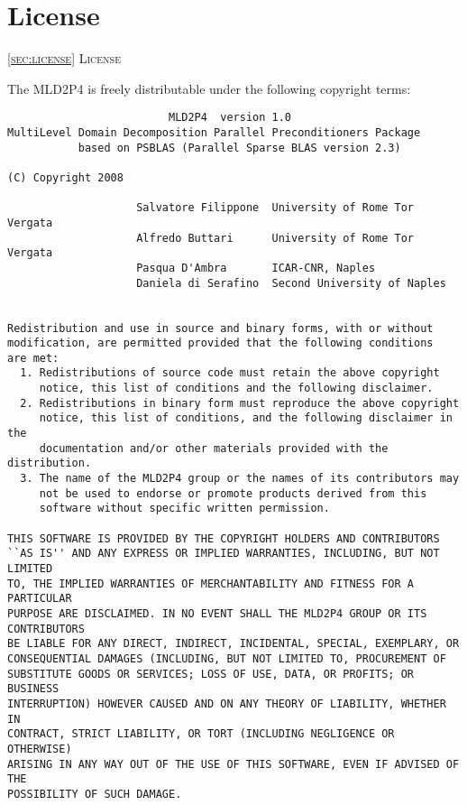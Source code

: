 \section{License\label{sec:license}}
         {\textsc{\ref{sec:license} License}}

The MLD2P4 is freely distributable under the following copyright
terms: {\small
\begin{verbatim} 
                         MLD2P4  version 1.0
MultiLevel Domain Decomposition Parallel Preconditioners Package
           based on PSBLAS (Parallel Sparse BLAS version 2.3)

(C) Copyright 2008

                    Salvatore Filippone  University of Rome Tor Vergata       
                    Alfredo Buttari      University of Rome Tor Vergata
                    Pasqua D'Ambra       ICAR-CNR, Naples
                    Daniela di Serafino  Second University of Naples


Redistribution and use in source and binary forms, with or without
modification, are permitted provided that the following conditions
are met:
  1. Redistributions of source code must retain the above copyright
     notice, this list of conditions and the following disclaimer.
  2. Redistributions in binary form must reproduce the above copyright
     notice, this list of conditions, and the following disclaimer in the
     documentation and/or other materials provided with the distribution.
  3. The name of the MLD2P4 group or the names of its contributors may
     not be used to endorse or promote products derived from this
     software without specific written permission.

THIS SOFTWARE IS PROVIDED BY THE COPYRIGHT HOLDERS AND CONTRIBUTORS
``AS IS'' AND ANY EXPRESS OR IMPLIED WARRANTIES, INCLUDING, BUT NOT LIMITED
TO, THE IMPLIED WARRANTIES OF MERCHANTABILITY AND FITNESS FOR A PARTICULAR
PURPOSE ARE DISCLAIMED. IN NO EVENT SHALL THE MLD2P4 GROUP OR ITS CONTRIBUTORS
BE LIABLE FOR ANY DIRECT, INDIRECT, INCIDENTAL, SPECIAL, EXEMPLARY, OR
CONSEQUENTIAL DAMAGES (INCLUDING, BUT NOT LIMITED TO, PROCUREMENT OF
SUBSTITUTE GOODS OR SERVICES; LOSS OF USE, DATA, OR PROFITS; OR BUSINESS
INTERRUPTION) HOWEVER CAUSED AND ON ANY THEORY OF LIABILITY, WHETHER IN
CONTRACT, STRICT LIABILITY, OR TORT (INCLUDING NEGLIGENCE OR OTHERWISE)
ARISING IN ANY WAY OUT OF THE USE OF THIS SOFTWARE, EVEN IF ADVISED OF THE
POSSIBILITY OF SUCH DAMAGE.
\end{verbatim}
}
